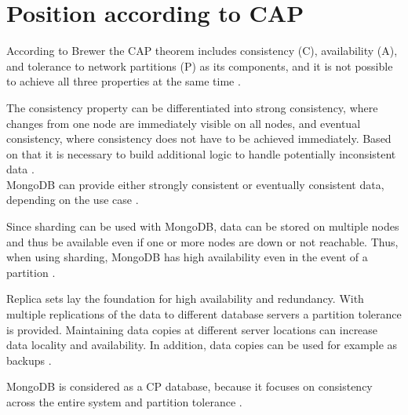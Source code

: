 
\section{Position according to CAP}

According to Brewer the CAP theorem includes consistency (C), availability (A), and tolerance to network partitions (P) as its 
components, and it is not possible to achieve all three properties at the same time \parencite{Brewer2000}.

The consistency property can be differentiated into strong consistency, where changes from one node are immediately visible on all nodes,
and eventual consistency, where consistency does not have to be achieved immediately.
Based on that it is necessary to build additional logic to handle potentially inconsistent data \parencite[pp. 4-5]{MongoDB2018}.
\\
MongoDB can provide either strongly consistent or eventually consistent data, depending on the use case \parencite[p. 5]{MongoDB2018}.

Since sharding can be used with MongoDB, data can be stored on multiple nodes and thus be available even if one or more nodes are down or 
not reachable. Thus, when using sharding, MongoDB has high availability even in the event of a partition \parencites{Mongo-Sharding}[p. 7]{Membrey2014}. 

Replica sets lay the foundation for high availability and redundancy. With multiple replications of the data to different database servers a partition tolerance is provided.
Maintaining data copies at different server locations can increase data locality and availability. In addition, data copies can be used for example as backups \parencite{Mongo-Replication}.

MongoDB is considered as a CP database, because it focuses on consistency across the entire system and partition tolerance \parencite{Jayasekara2021}.